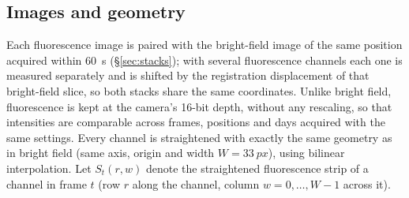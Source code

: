 \documentclass[11pt,a4paper]{article}
\begin{document}
\subsection{Images and geometry}
Each fluorescence image is paired with the bright-field image of the same position acquired within \SI{60}{\second} (\S\ref{sec:stacks}); with several fluorescence channels each one is measured separately and is shifted by the registration displacement of that bright-field slice, so both stacks share the same coordinates. Unlike bright field, fluorescence is kept at the camera's 16-bit depth, without any rescaling, so that intensities are comparable across frames, positions and days acquired with the same settings. Every channel is straightened with exactly the same geometry as in bright field (same axis, origin and width $W=\SI{33}{px}$), using bilinear interpolation. Let $S_t(r,w)$ denote the straightened fluorescence strip of a channel in frame $t$ (row $r$ along the channel, column $w=0,\dots,W-1$ across it).
\end{document}
